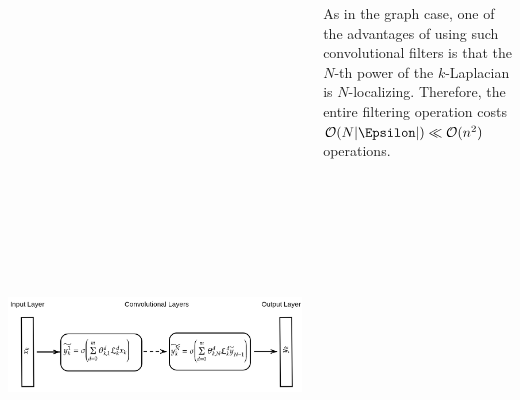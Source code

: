 \documentclass[landscape,a0paper]{tikzposter}
\begin{document}
\begin{columns}
{{      \begin{center}
          \includegraphics[height=18cm]{figures/net.png}
          \end{center}

As in the graph case, one of the advantages of using such convolutional filters is that the $N$-th power of the $k$-Laplacian is $N$-localizing. Therefore, the entire filtering operation costs $\mathcal{O}(N|\Epsilon|)  \ll \mathcal{O}(n^2)$ operations.  

    }    
    
    
  

  }
  
\end{columns}
\end{document}
